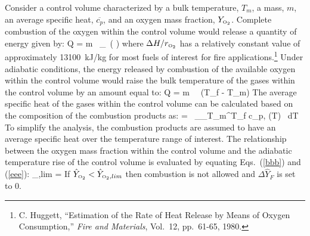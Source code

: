 Consider a control volume characterized
by a bulk temperature, $T_m$, a mass, $m$, an average specific heat, $\overline{c_p}$, and an oxygen mass
fraction, $Y_{\text{\tiny \hbox{O}$_2$}}$.  Complete combustion of the oxygen within the control volume would release a
quantity of energy given by:
\be
   Q = m \, _\OTWO \, \left(   \right)  \label{bbb}
\ee
where $\Delta H/r_{\text{\tiny \hbox{O}$_2$}}$ has a relatively constant value of
approximately 13100~kJ/kg for most fuels of interest for fire applications.\footnote{C. Huggett, ``Estimation of the Rate of Heat
Release by Means of Oxygen
Consumption,'' {\em Fire and Materials}, Vol.~12, pp.~61-65, 1980.}
Under adiabatic conditions, the energy released by combustion of the available oxygen within
the control volume would raise the bulk temperature of the gases within the control volume by an
amount equal to:
\be
   Q = m \,  \, (T_f - T_m)  \label{eee}
\ee
The average specific heat of the gases within the control volume can be calculated based on the
composition of the combustion products as:
\be
    =  \, \sum_\alpha \int_{T_m}^{T_f} c_{p,\alpha} (T) \, dT
\ee
To simplify the analysis, the combustion products are assumed to have an average specific heat
over the temperature range of interest. The relationship between the oxygen mass fraction within the control volume and the
adiabatic
temperature rise of the control volume is evaluated by equating Eqs.~(\ref{bbb}) and (\ref{eee}):
\be
   _{\OTWO,lim} = 
\ee
If $\hat{Y}_{\text{\tiny \hbox{O}$_2$}} < \hat{Y}_{\text{\tiny \hbox{O}$_2$},lim}$ then combustion is not allowed and  $\Delta \hat{Y}_{F}$ is set to 0.

